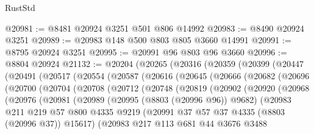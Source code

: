 \begin{lexlean}{RustStd}
\begin{coremodule}
@20981 := @8481 @20924 @3251 @501 @806 @14992
@20983 := @8490 @20924 @3251
@20989 := @20983 @148 @500 @803 @805 @3660 @14991
@20991 := @8795 @20924 @3251
@20995 := @20991 @96 @803 @96 @3660
@20996 := @8804 @20924
@21132 := @20204
    (@20265
      (@20316
        (@20359
          (@20399
            (@20447
              (@20491
                (@20517
                  (@20554
                    (@20587
                      (@20616
                        (@20645
                          (@20666
                            (@20682
                              (@20696
                                (@20700
                                  (@20704
                                    (@20708
                                      (@20712
                                        (@20748
                                          (@20819
                                            (@20902
                                              (@20920
                                                (@20968
                                                  (@20976
                                                    (@20981
                                                      (@20989
                                                        (@20995 (@8803 (@20996 @96)) @9682)
                                                        (@20983
                                                          @211
                                                          @219
                                                          @57
                                                          @800
                                                          @4335
                                                          @9219
                                                          (@20991
                                                            @37
                                                            @57
                                                            @37
                                                            @4335
                                                            (@8803 (@20996 @37))
                                                            @15617)
                                                          (@20983
                                                            @217
                                                            @113
                                                            @681
                                                            @44
                                                            @3676
                                                            @3488

\end{coremodule}
\end{lexlean}
